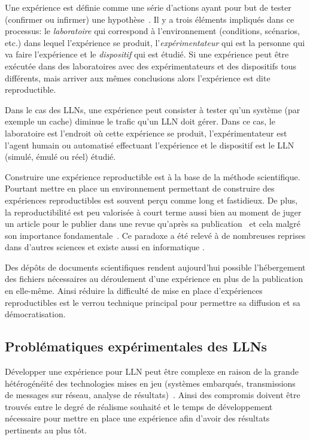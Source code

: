 Une expérience est définie comme une série d'actions ayant pour but de tester (confirmer ou infirmer) une hypothèse~\cite{fisher1960design,bachelard1975nouvel}.
Il y a trois éléments impliqués dans ce processus: le \emph{laboratoire} qui correspond à l'environnement (conditions, scénarios, etc.) dans lequel l'expérience se produit, l'\emph{expérimentateur} qui est la personne qui va faire l'expérience et le \emph{dispositif} qui est étudié. 
Si une expérience peut être exécutée dans des laboratoires avec des expérimentateurs et des dispositifs tous différents, mais arriver aux mêmes conclusions alors l'expérience est dite reproductible.

Dans le cas des \ac{LLN}s, une expérience peut consister à tester qu'un système (par exemple un cache) diminue le trafic qu'un \ac{LLN} doit gérer.
Dans ce cas, le laboratoire est l'endroit où cette expérience se produit, l'expérimentateur est l'agent humain ou automatisé effectuant l'expérience et le dispositif est le \ac{LLN} (simulé, émulé ou réel) étudié.

Construire une expérience reproductible est à la base de la méthode scientifique.
Pourtant mettre en place un environnement permettant de construire des expériences reproductibles est souvent perçu comme long et fastidieux.
De plus, la reproductibilité est peu valorisée à court terme aussi bien au moment de juger un article pour le publier dans une revue qu'après sa publication~\cite{fink2013conducting,wilson2014best} et cela malgré son importance fondamentale~\cite{popper-scientificdiscovery}.
Ce paradoxe a été relevé à de nombreuses reprises dans d'autres sciences et existe aussi en informatique \cite{peng2011reproducible}.

Des dépôts de documents scientifiques rendent aujourd'hui possible l'hébergement des fichiers nécessaires au déroulement d'une expérience en plus de la publication en elle-même.
Ainsi réduire la difficulté de mise en place d'expériences reproductibles est le verrou technique principal pour permettre sa diffusion et sa démocratisation.

\subsection{Problématiques expérimentales des \ac{LLN}s} 

Développer une expérience pour \ac{LLN} peut être complexe en raison de la grande hétérogénéité des technologies mises en jeu (systèmes embarqués, transmissions de messages sur réseau, analyse de résultats)~\cite{baronti2007wireless}.
Ainsi des compromis doivent être trouvés entre le degré de réalisme souhaité et le temps de développement nécessaire pour mettre en place une expérience afin d'avoir des résultats pertinents au plus tôt.

